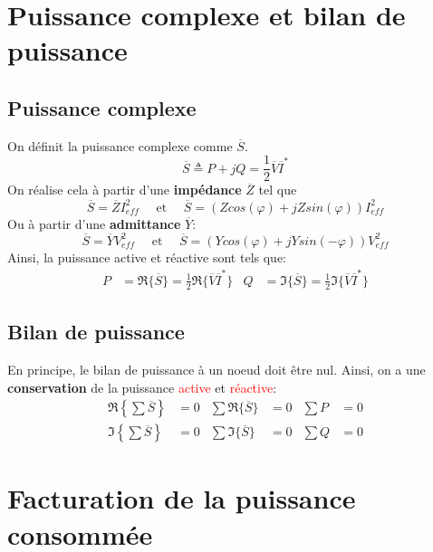 \documentclass{report}
\begin{document}
\section{Puissance complexe et bilan de puissance}
\subsection{Puissance complexe}
On définit la puissance complexe comme $\overline{S}$.
\begin{equation}
\overline{S} \triangleq P + j Q = \frac{1}{2} \overline{V}\overline{I}^*
\end{equation}
On réalise cela à partir d'une \textbf{impédance} $\overline{Z}$ tel que
\begin{equation}
\overline{S} = \overline{Z} I_{eff}^2 \quad
\text{ et } \quad \overline{S} = (Z cos(\varphi) + j Z sin(\varphi )) I_{eff}^2
\end{equation}
Ou à partir d'une \textbf{admittance} $\overline{Y}$:
\begin{equation}
\overline{S} = \overline{Y} V_{eff}^2 \quad \text{ et } \quad \overline{S} = (Y cos(\varphi) + j Y sin( - \varphi)) V_{eff}^2
\end{equation}
Ainsi, la puissance active et réactive sont tels que:
\begin{align*}
P &= \mathfrak{R}\{\overline{S}\} = \frac{1}{2} \mathfrak{R} \{\overline{V} \overline{I}^*\} & Q &= \mathfrak{I}\{\overline{S}\} = \frac{1}{2} \mathfrak{I} \{\overline{V} \overline{I}^*\}
\end{align*}

\subsection{Bilan de puissance}
En principe, le bilan de puissance à un noeud doit être nul. Ainsi, on a une \textbf{conservation} de la puissance \textcolor{red}{active} et \textcolor{red}{réactive}:
\begin{align*}
\mathfrak{R} \left\lbrace \sum \overline{S} \right\rbrace &= 0 & \sum \mathfrak{R}\{\overline{S}\} &= 0 & \sum P &= 0\\
\mathfrak{I} \left\lbrace \sum \overline{S} \right\rbrace &= 0 & \sum \mathfrak{I}\{\overline{S}\} &= 0 & \sum Q &= 0
\end{align*}

\section{Facturation de la puissance consommée}
\end{document}
